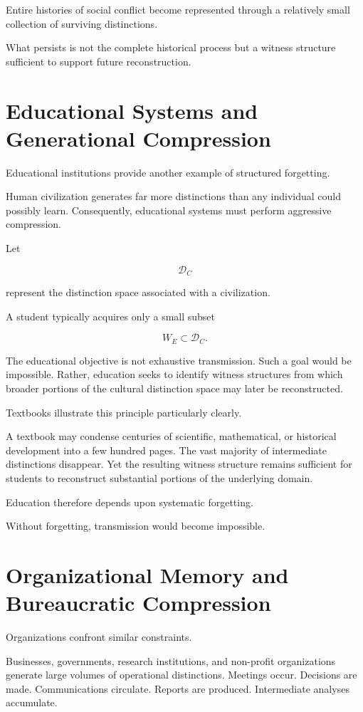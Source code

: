 \documentclass[12pt,oneside]{book}
\theoremstyle{plain} \newtheorem{theorem}{Theorem}[chapter] \newtheorem{lemma}[theorem]{Lemma} \newtheorem{proposition}[theorem]{Proposition} \newtheorem{corollary}[theorem]{Corollary}
\theoremstyle{definition} \newtheorem{definition}[theorem]{Definition} \newtheorem{axiom}[theorem]{Axiom} \newtheorem{construction}[theorem]{Construction}
\theoremstyle{remark} \newtheorem{remark}[theorem]{Remark} \newtheorem{example}[theorem]{Example}
\newcommand{\D}{\mathcal{D}} \newcommand{\R}{\mathcal{R}} \newcommand{\F}{\mathcal{F}} \newcommand{\U}{\mathcal{U}} \newcommand{\M}{\mathcal{M}} \newcommand{\G}{\Gamma}
\begin{document}
Entire histories of social conflict become represented through a relatively small collection of surviving distinctions.

What persists is not the complete historical process but a witness structure sufficient to support future reconstruction.

\section{Educational Systems and Generational Compression}

Educational institutions provide another example of structured forgetting.

Human civilization generates far more distinctions than any individual could possibly learn. Consequently, educational systems must perform aggressive compression.

Let

\[
\D_C
\]

represent the distinction space associated with a civilization.

A student typically acquires only a small subset

\[
W_E
\subset
\D_C.
\]

The educational objective is not exhaustive transmission. Such a goal would be impossible. Rather, education seeks to identify witness structures from which broader portions of the cultural distinction space may later be reconstructed.

Textbooks illustrate this principle particularly clearly.

A textbook may condense centuries of scientific, mathematical, or historical development into a few hundred pages. The vast majority of intermediate distinctions disappear. Yet the resulting witness structure remains sufficient for students to reconstruct substantial portions of the underlying domain.

Education therefore depends upon systematic forgetting.

Without forgetting, transmission would become impossible.

\section{Organizational Memory and Bureaucratic Compression}

Organizations confront similar constraints.

Businesses, governments, research institutions, and non-profit organizations generate large volumes of operational distinctions. Meetings occur. Decisions are made. Communications circulate. Reports are produced. Intermediate analyses accumulate.
\end{document}
